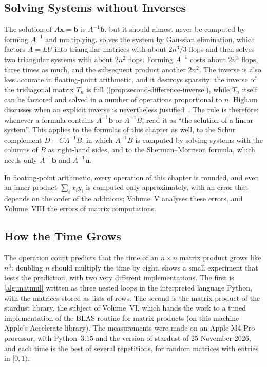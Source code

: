 \subsection{Solving Systems without Inverses}

The solution of $A\mathbf x=\mathbf b$ is $A^{-1}\mathbf b$, but it should almost never be computed by forming $A^{-1}$ and multiplying.  solves the system by Gaussian elimination, which factors $A=LU$ into triangular matrices with about $2n^3/3$ flops and then solves two triangular systems with about $2n^2$ flops. Forming $A^{-1}$ costs about $2n^3$ flops, three times as much, and the subsequent product another $2n^2$. The inverse is also less accurate in floating-point arithmetic, and it destroys sparsity: the inverse of the tridiagonal matrix $T_n$ is full (\cref{prop:second-difference-inverse}), while $T_n$ itself can be factored and solved in a number of operations proportional to $n$. Higham discusses when an explicit inverse is nevertheless justified~\cite[Chap.~14]{higham2002accuracy}. The rule is therefore: whenever a formula contains $A^{-1}\mathbf b$ or $A^{-1}B$, read it as ``the solution of a linear system''. This applies to the formulas of this chapter as well, to the Schur complement $D-CA^{-1}B$, in which $A^{-1}B$ is computed by solving systems with the columns of $B$ as right-hand sides, and to the Sherman--Morrison formula, which needs only $A^{-1}\mathbf b$ and $A^{-1}\mathbf u$.

In floating-point arithmetic, every operation of this chapter is rounded, and even an inner product $\sum_ix_iy_i$ is computed only approximately, with an error that depends on the order of the additions; Volume~V analyses these errors, and Volume~VIII the errors of matrix computations.

\subsection{How the Time Grows}

The operation count predicts that the time of an $n\times n$ matrix product grows like $n^3$: doubling $n$ should multiply the time by eight.  shows a small experiment that tests the prediction, with two very different implementations. The first is \cref{alg:matmul} written as three nested loops in the interpreted language Python, with the matrices stored as lists of rows. The second is the matrix product of the stardust library, the subject of Volume~VI, which hands the work to a tuned implementation of the BLAS routine for matrix products (on this machine Apple's Accelerate library). The measurements were made on an Apple M4 Pro processor, with Python~3.15 and the version of stardust of 25 November 2026, and each time is the best of several repetitions, for random matrices with entries in $[0,1)$.

